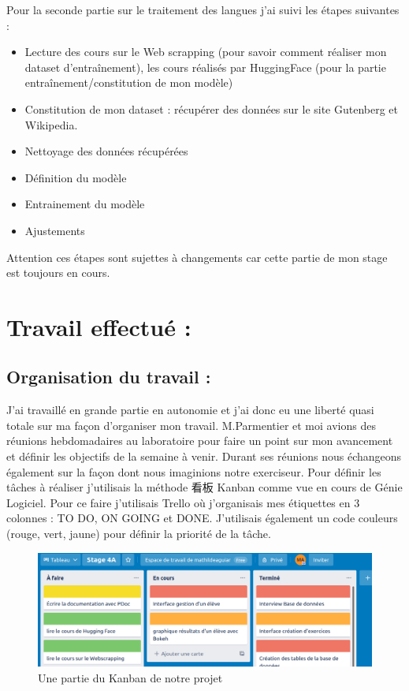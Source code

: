 \documentclass[12pt]{article}
\begin{document}
Pour la seconde partie sur le traitement des langues j'ai suivi les étapes suivantes :

\begin{itemize}
    \item Lecture des cours sur le Web scrapping (pour savoir comment réaliser mon dataset d'entraînement), les cours réalisés par HuggingFace (pour la partie entraînement/constitution de mon modèle)
    
    \item Constitution de mon dataset : récupérer des données sur le site Gutenberg et Wikipedia.
    
    \item Nettoyage des données récupérées
    
    \item Définition du modèle
    
    \item Entrainement du modèle
    
    \item Ajustements 
\end{itemize}

Attention ces étapes sont sujettes à changements car cette partie de mon stage est toujours en cours.


\section{Travail effectué :}
\subsection{Organisation du travail :}

J’ai travaillé en grande partie en autonomie et j’ai donc eu une liberté quasi totale sur ma façon d’organiser mon travail. M.Parmentier et moi avions des réunions hebdomadaires au laboratoire pour faire un point sur mon avancement et définir les objectifs de la semaine à venir. Durant ses réunions nous échangeons également sur la façon dont nous imaginions notre exerciseur. 
Pour définir les tâches à réaliser j’utilisais la méthode 看板 Kanban comme vue en cours de Génie Logiciel. Pour ce faire j’utilisais Trello où j’organisais mes étiquettes en 3 colonnes : TO DO, ON GOING et DONE. J’utilisais également un code couleurs (rouge, vert, jaune) pour définir la priorité de la tâche.  \\

\begin{figure}[h]
    \centering
    \includegraphics[scale=0.4]{trello.png}
    \caption{Une partie du Kanban de notre projet}
    \label{fig:trello}
\end{figure}
\end{document}
